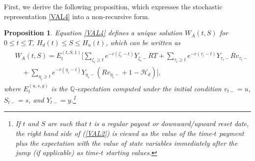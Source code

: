 \documentclass[draft, noinfoline]{ectaart}
\numberwithin{equation}{section}
\theoremstyle{plain}
\newtheorem{proposition}{Proposition}
\begin{document}
\begin{appendices}
First, we derive the following proposition, which expresses the stochastic representation \eqref{VAL4} into a non-recursive form.
\begin{proposition}\label{prop:nonrecur}
	Equation \eqref{VAL4} defines a unique solution $W_A(t,S)$ for $0\le t\le T$, $H_d(t)\le S\le H_u(t)$, which can be written as
	\begin{align}\label{VALnonrecur}
	\begin{split}
	&W_A(t,S)=E_t^{(t,S,1)}\Bigg[\sum_{\zeta_i\ge t}e^{-r(\zeta_i-t)}Y_{\zeta_i-}RT+\sum_{\tau_i\ge t}e^{-r(\tau_i-t)}Y_{\tau_i-}Rv_{\tau_i-}\\
	&\quad+\sum_{\eta_i\ge t}e^{-r(\eta_i-t)}Y_{\eta_i-}(Rv_{\eta_i-}+1-\mathcal{H}_d)\Bigg],
	\end{split}
	\end{align}
	where $E^{(u,s,y)}_t$ is the $\mathbb{Q}$-expectation computed under the initial condition $v_{t-}=u$, $S_{t-}=s$, and $Y_{t-}=y$.\footnote{If $t$ and $S$ are such that $t$ is a regular payout or downward/upward reset date, the right hand side of (\ref{VAL2}) is viewed as the value of the time-$t$ payment plus the expectation with the value of state variables immediately after the jump (if applicable) as time-$t$ starting values.}
\end{proposition}


\end{appendices}
\end{document}
